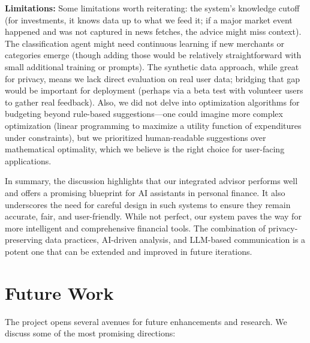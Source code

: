 \documentclass{scrartcl}
\begin{document}
\textbf{Limitations:} Some limitations worth reiterating: the system’s knowledge cutoff (for investments, it knows data up to what we feed it; if a major market event happened and was not captured in news fetches, the advice might miss context). The classification agent might need continuous learning if new merchants or categories emerge (though adding those would be relatively straightforward with small additional training or prompts). The synthetic data approach, while great for privacy, means we lack direct evaluation on real user data; bridging that gap would be important for deployment (perhaps via a beta test with volunteer users to gather real feedback). Also, we did not delve into optimization algorithms for budgeting beyond rule-based suggestions—one could imagine more complex optimization (linear programming to maximize a utility function of expenditures under constraints), but we prioritized human-readable suggestions over mathematical optimality, which we believe is the right choice for user-facing applications.

In summary, the discussion highlights that our integrated advisor performs well and offers a promising blueprint for AI assistants in personal finance. It also underscores the need for careful design in such systems to ensure they remain accurate, fair, and user-friendly. While not perfect, our system paves the way for more intelligent and comprehensive financial tools. The combination of privacy-preserving data practices, AI-driven analysis, and LLM-based communication is a potent one that can be extended and improved in future iterations.

\section{Future Work}
The project opens several avenues for future enhancements and research. We discuss some of the most promising directions:
\end{document}
